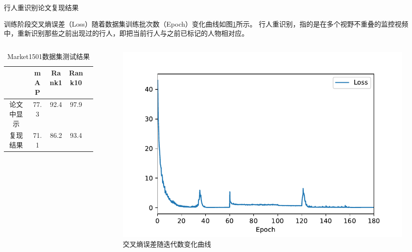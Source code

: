    \begin{frame}{行人重识别论文复现结果}
    \begin{block}{}
    训练阶段交叉熵误差（Loss）随着数据集训练批次数（Epoch）变化曲线如图\ref{fig:loss}所示。
    行人重识别，指的是在多个视野不重叠的监控视频中，重新识别那些之前出现过的行人，即把当前行人与之前已标记的人物相对应。
    \end{block}
    \begin{columns}[]
    \centering
    \begin{column}{0.6\textwidth}
        \begin{table}
            \centering
            \begin{tabular}{@{}ccccc@{}}
            \toprule
                    & mAP   & Rank1 & Rank10 \\ \midrule
            论文中显示  & 77.3  & 92.4  & 97.9   \\
            复现结果   & 71.1  & 86.2  & 93.4   \\ \bottomrule
            \end{tabular}
            \caption{Market1501数据集测试结果}
            \label{tab:test}
        \end{table}
    \end{column}
    \begin{column}{0.3\textwidth}
        \begin{figure}[]
            \centering
            \includegraphics[width=\textwidth]{figures/loss}
            \caption{交叉熵误差随迭代数变化曲线}
            \label{fig:loss}
        \end{figure}
    \end{column}
    \end{columns}
    \end{frame}

